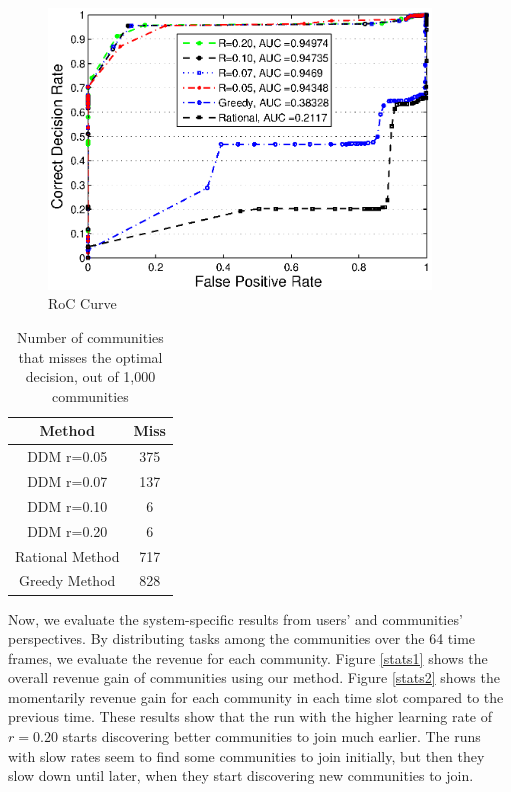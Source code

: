 {\begin{figure}%
\centering
\includegraphics[width=4in]{figures/roc.eps}
\caption{RoC Curve}
\label{roc5}
\end{figure}

\begin{table}[ht]
\caption{Number of communities that misses the optimal decision, out of 1,000 communities} %
\centering %
\begin{tabular}{|c|c|} %
\hline %
 Method&Miss \\ [0.5ex] %
\hline %
 DDM r=0.05& 375 \\ %
 DDM r=0.07& 137 \\
 DDM r=0.10& 6 \\
 DDM r=0.20& 6 \\
Rational Method& 717 \\
Greedy Method& 828 \\ [1ex] %
\hline %
\end{tabular}
\label{fail_rate} %
\end{table}


Now, we evaluate the system-specific results from users' and communities' perspectives. By distributing tasks among the communities over the 64 time frames, we evaluate the revenue for each community. Figure \ref{stats1} shows the overall revenue gain of communities using our method. Figure \ref{stats2} shows the momentarily revenue gain for each community in each time slot compared to the previous time. These results show that the run with the higher learning rate of $r=0.20$ starts discovering better communities to join much earlier. The runs with slow rates seem to find some communities to join initially, but then they slow down until later, when they start discovering new communities to join.


}
